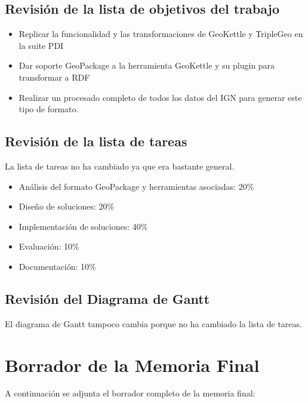 \documentclass[11pt]{article}
\begin{document}
\subsection{Revisión de la lista de objetivos del trabajo}
\begin{itemize}
    \item Replicar la funcionalidad y las transformaciones de GeoKettle y TripleGeo en la suite PDI
    \item Dar soporte GeoPackage a la herramienta GeoKettle y su plugin para transformar a RDF
    \item Realizar un procesado completo de todos los datos del IGN para generar este tipo de formato.
\end{itemize}

\subsection{Revisión de la lista de tareas}
La lista de tareas no ha cambiado ya que era bastante general.
\begin{itemize}
    \item Análisis del formato GeoPackage y herramientas asociadas: 20\%
    \item Diseño de soluciones: 20\%
    \item Implementación de soluciones: 40\%
    \item Evaluación: 10\%
    \item Documentación: 10\%
\end{itemize}

\subsection{Revisión del Diagrama de Gantt}
El diagrama de Gantt tampoco cambia porque no ha cambiado la lista de tareas.


\section{Borrador de la Memoria Final}
A continuación se adjunta el borrador completo de la memoria final:


\end{document}
